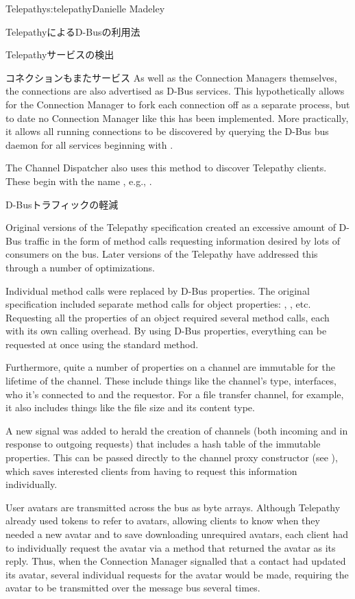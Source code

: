 \begin{aosachapter}{Telepathy}{s:telepathy}{Danielle Madeley}
\begin{aosasect1}{TelepathyによるD-Busの利用法}
\begin{aosasect2}{Telepathyサービスの検出}
\begin{aosabox}{コネクションもまたサービス}
As well as the Connection Managers themselves, the connections are
also advertised as D-Bus services. This hypothetically allows for the
Connection Manager to fork each connection off as a separate process,
but to date no Connection Manager like this has been implemented.
More practically, it allows all running connections to be discovered
by querying the D-Bus bus daemon for all services beginning with
.

\end{aosabox}

The Channel Dispatcher also uses this method to discover Telepathy
clients. These begin with the name , e.g.,
.

\end{aosasect2}

\begin{aosasect2}{D-Busトラフィックの軽減}

Original versions of the Telepathy specification created an excessive
amount of D-Bus traffic in the form of method calls requesting
information desired by lots of consumers on the bus. Later versions of
the Telepathy have addressed this through a number of optimizations.

Individual method calls were replaced by D-Bus properties. The
original specification included separate method calls for object
properties: , ,
etc. Requesting all the properties of an object required several
method calls, each with its own calling overhead. By using D-Bus
properties, everything can be requested at once using the standard
 method.

Furthermore, quite a number of properties on a channel are immutable
for the lifetime of the channel. These include things like the
channel's type, interfaces, who it's connected to and the requestor.
For a file transfer channel, for example, it also includes things like
the file size and its content type.

A new signal was added to herald the creation of channels (both
incoming and in response to outgoing requests) that includes a hash
table of the immutable properties.  This can be passed directly to the
channel proxy constructor (see ),
which saves interested clients from having to request this information
individually.

User avatars are transmitted across the bus as byte arrays. Although
Telepathy already used tokens to refer to avatars, allowing clients to
know when they needed a new avatar and to save downloading unrequired
avatars, each client had to individually request the avatar via a
 method that returned the avatar as its reply.
Thus, when the Connection Manager signalled that a contact had updated
its avatar, several individual requests for the avatar would be made,
requiring the avatar to be transmitted over the message bus several
times.


\end{aosasect2}
\end{aosasect1}
\end{aosachapter}
